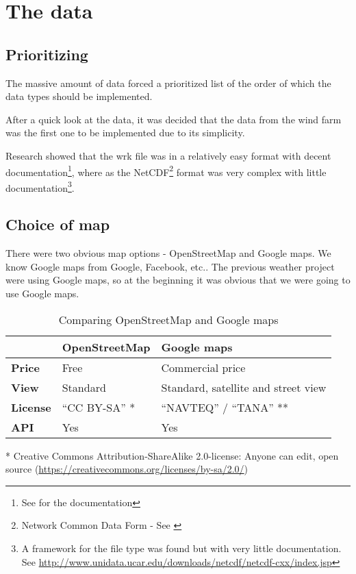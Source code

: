 \section{The data}
\subsection{Prioritizing}
The massive amount of data forced a prioritized list of the order of which the data types should be implemented.

After a quick look at the data, it was decided that the data from the wind farm was the first one to be implemented due to its simplicity.

Research showed that the wrk file was in a relatively easy format with decent documentation\footnote{See \cite{VRIS} for the documentation}, where as the NetCDF\footnote{Network Common Data Form - See \cite{netcdf}} format was very complex with little documentation\footnote{A framework for the file type was found but with very little documentation. See \url{http://www.unidata.ucar.edu/downloads/netcdf/netcdf-cxx/index.jsp}}.

\subsection{Choice of map}
There were two obvious map options - OpenStreetMap and Google maps. We know Google maps from Google, Facebook, etc.. The previous weather project were using Google maps, so at the beginning it was obvious that we were going to use Google maps.

\begin{table}[htbp]
\centering
\begin{tabular}{| l | l | l |}
\hline
& \textbf{OpenStreetMap} & \textbf{Google maps} \\
\hline
\textbf{Price} & Free & Commercial price \\
\hline
\textbf{View} & Standard & Standard, satellite and street view \\
\hline
\textbf{License} & ``CC BY-SA'' * & ``NAVTEQ'' / ``TANA'' ** \\
\hline
\textbf{API} & Yes & Yes \\
\hline
\end{tabular}
\caption{Comparing OpenStreetMap and Google maps}
\label{tab:osm_vs_google}
\end{table}
* Creative Commons Attribution-ShareAlike 2.0-license: Anyone can edit, open source (\url{https://creativecommons.org/licenses/by-sa/2.0/})

